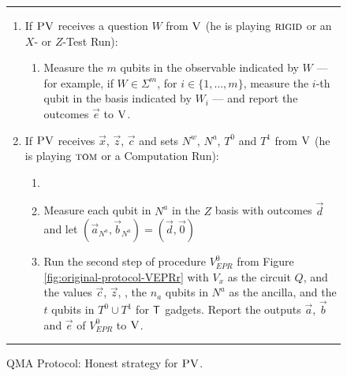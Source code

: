 \begin{figure}[H]
\rule[1ex]{\textwidth}{0.5pt}
\vspace{-20pt}
\begin{enumerate}
  \item If $\textsc{PV}$ receives a question ${W}$ from $\textsc{V}$ (he is playing $\textsc{rigid}$ or an $X$- or $Z$-Test Run):
\begin{enumerate}
     \item[]  Measure the $m$ qubits in the observable indicated by $W$ --- for example, if $W\in \Sigma^m$, for $i\in \{1,\ldots,m\}$, measure the $i$-th qubit in the basis indicated by $W_i$ --- and report the outcomes $\vec{e}$ to $\textsc{V}$.
\end{enumerate}

  \item If $\textsc{PV}$ receives $\vec{x}$, $\vec{z}$, $\vec{c}$ and sets $N^w$, $N^a$, $T^0$ and $T^1$ from $\textsc{V}$ (he is playing $\textsc{tom}$ or a Computation Run):
\begin{enumerate}
  \item[] 
  \item[] Measure each qubit in $N^a$ in the $Z$ basis with outcomes $\vec{d}$  and let $(\vec{a}_{N^a},
    \vec{b}_{N^a}) = (\vec{d}, \vec{0} )$ 
	\item[] Run the second step of procedure $V_{EPR}^0$ from Figure
    \ref{fig:original-protocol-VEPRr} with $V_x$ as the circuit $Q$, and the
    values $\vec{c}$, $\vec{z}$, , the $n_a$ qubits in 
        $N^a$ as the ancilla, and the $t$ qubits in $T^0\cup T^1$ for $\sf T$ gadgets. Report the outputs  $\vec{a}$, $\vec{b}$ and $\vec{e}$ of $V_{EPR}^0$ to $\textsc{V}$.
\end{enumerate}
\end{enumerate}
\rule[2ex]{\textwidth}{0.5pt}\vspace{-.5cm}
\caption{QMA Protocol: Honest strategy for $\textsc{PV}$.}\label{fig:qma-protocol-PV}
\end{figure}




